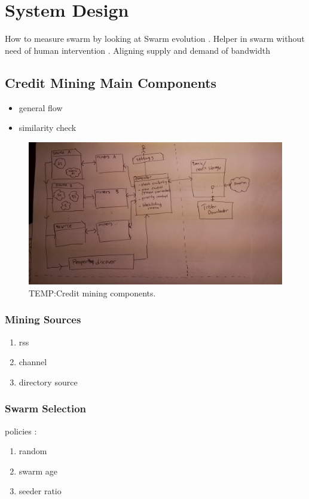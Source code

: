 \chapter{System Design}
\label{chp:design}

How to measure swarm by looking at Swarm evolution \cite{2013:swarmevolution:su}.
Helper in swarm without need of human intervention \cite{2014:bwmarket:capota}. Aligning supply and demand of bandwidth

\section{Credit Mining Main Components}

\begin{itemize}
\item general flow
\item similarity check
\end{itemize}


\begin{figure}[ht]
	\centering
	\includegraphics[width=\textwidth]{pics/cm_components.jpg}
	\caption{TEMP:Credit mining components.}
	\label{fig:cmcomponents}
\end{figure}

\subsection{Mining Sources}
\begin{enumerate}
	\item rss
	\item channel
	\item directory source
\end{enumerate}

\subsection{Swarm Selection}
 policies : 
\begin{enumerate}
	\item random
	\item swarm age
	\item seeder ratio
\end{enumerate}

